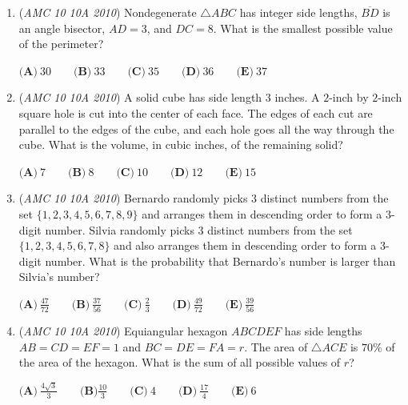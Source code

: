 \begin{enumerate}
 Brian: "Mike and I are different species."


 Chris: "LeRoy is a frog."


 LeRoy: "Chris is a frog."


 Mike: "Of the four of us, at least two are toads."


 How many of these amphibians are frogs?


 $\textbf{(A)}\ 0 \qquad \textbf{(B)}\ 1 \qquad \textbf{(C)}\ 2 \qquad \textbf{(D)}\ 3 \qquad \textbf{(E)}\ 4$


	\item (\textit{AMC 10 10A 2010}) Nondegenerate ${\triangle ABC}$  has integer side lengths, ${\overline{BD}}$ is an angle bisector, $AD = 3$, and $DC=8$. What is the smallest possible value of the perimeter?


 $\textbf{(A)}\ 30 \qquad \textbf{(B)}\ 33 \qquad \textbf{(C)}\ 35 \qquad \textbf{(D)}\ 36 \qquad \textbf{(E)}\ 37$


	\item (\textit{AMC 10 10A 2010}) A solid cube has side length $3$ inches. A $2$-inch by $2$-inch square hole is cut into the center of each face. The edges of each cut are parallel to the edges of the cube, and each hole goes all the way through the cube. What is the volume, in cubic inches, of the remaining solid?


 $\textbf{(A)}\ 7 \qquad \textbf{(B)}\ 8 \qquad \textbf{(C)}\ 10 \qquad \textbf{(D)}\ 12 \qquad \textbf{(E)}\ 15$


	\item (\textit{AMC 10 10A 2010}) Bernardo randomly picks 3 distinct numbers from the set $\{1,2,3,4,5,6,7,8,9\}$ and arranges them in descending order to form a 3-digit number. Silvia randomly picks 3 distinct numbers from the set $\{1,2,3,4,5,6,7,8\}$ and also arranges them in descending order to form a 3-digit number. What is the probability that Bernardo's number is larger than Silvia's number?


 $\textbf{(A)}\ \frac{47}{72} \qquad \textbf{(B)}\ \frac{37}{56} \qquad \textbf{(C)}\ \frac{2}{3} \qquad \textbf{(D)}\ \frac{49}{72} \qquad \textbf{(E)}\ \frac{39}{56}$


	\item (\textit{AMC 10 10A 2010}) Equiangular hexagon $ABCDEF$ has side lengths $AB=CD=EF=1$ and $BC=DE=FA=r$. The area of $\triangle ACE$ is $70\%$ of the area of the hexagon. What is the sum of all possible values of $r$?


 $\textbf{(A)}\ \frac{4\sqrt{3}}{3} \qquad \textbf{(B)} \frac{10}{3} \qquad \textbf{(C)}\ 4 \qquad \textbf{(D)}\ \frac{17}{4} \qquad \textbf{(E)}\ 6$



\end{enumerate}
